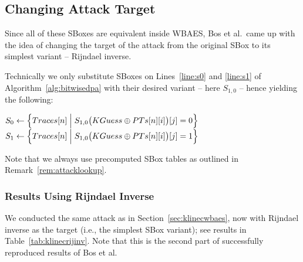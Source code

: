 
\subsection{Changing Attack Target}
\label{sec:rijinv}

Since all of these SBoxes are equivalent inside WBAES, Bos et al.\ came up with the idea of changing the target of the attack from the original SBox to its simplest variant -- Rijndael inverse.

\begin{remark}
\label{rem:spq}
	Technically we only substitute SBoxes on Lines~\ref{line:s0} and \ref{line:s1} of Algorithm~\ref{alg:bitwisedpa} with their desired variant -- here $S_{1,0}$ -- hence yielding the following:
	\begin{algorithmic}[1]
		\setcounter{ALG@line}{5}
		\State $S_0 \gets \Bigl\{ Traces[n] \Bigm| S_{1,0}\bigl(KGuess\oplus PTs[n][i]\bigr)[j] = 0 \Bigr\}$
		\State $S_1 \gets \Bigl\{ Traces[n] \Bigm| S_{1,0}\bigl(KGuess\oplus PTs[n][i]\bigr)[j] = 1 \Bigr\}$
	\end{algorithmic}
	Note that we always use precomputed SBox tables as outlined in Remark~\ref{rem:attacklookup}.
\end{remark}

\subsubsection{Results Using Rijndael Inverse}
	
	We conducted the same attack as in Section~\ref{sec:klinecwbaes}, now with Rijndael inverse as the target (i.e., the simplest SBox variant); see results in Table~\ref{tab:klinecrijinv}. Note that this is the second part of successfully reproduced results of Bos et al.
	
	
